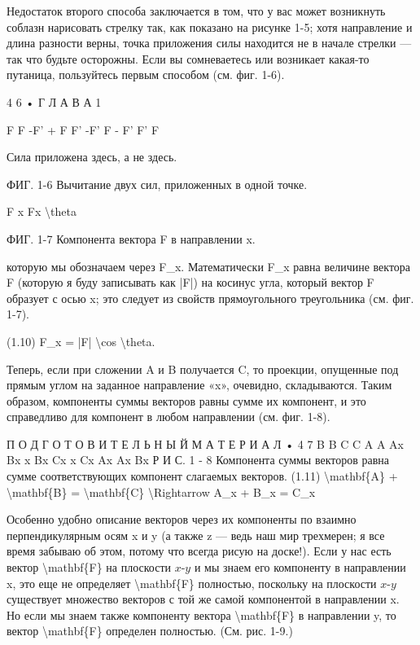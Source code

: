 \documentclass[10pt,oneside]{article}
\begin{document}
Недостаток второго способа заключается в том, что у вас может возникнуть соблазн нарисовать стрелку так, как показано на рисунке 1-5; хотя направление и длина разности верны, точка приложения силы находится не в начале стрелки --- так что будьте осторожны. Если вы сомневаетесь или возникает какая-то путаница, пользуйтесь первым способом (см. фиг. 1-6).\par

4 6 • Г Л А В А  1\par

F F -F' + F F' -F' F - F' F' F\par

Сила приложена здесь, а не здесь.\par

ФИГ. 1-6 Вычитание двух сил, приложенных в одной точке.\par

F x Fx \textbackslash{}theta\par

ФИГ. 1-7 Компонента вектора F в направлении x.\par

которую мы обозначаем через F\_x. Математически F\_x равна величине вектора F (которую я буду записывать как |F|) на косинус угла, который вектор F образует с осью x; это следует из свойств прямоугольного треугольника (см. фиг. 1-7).\par

(1.10) F\_x = |F| \textbackslash{}cos \textbackslash{}theta.\par

Теперь, если при сложении A и B получается C, то проекции, опущенные под прямым углом на заданное направление «x», очевидно, складываются. Таким образом, компоненты суммы векторов равны сумме их компонент, и это справедливо для компонент в любом направлении (см. фиг. 1-8).\par

П О Д Г О Т О В И Т Е Л Ь Н Ы Й   М А Т Е Р И А Л • 4 7 B B C C A A Ax Bx x Bx Cx x Cx Ax Ax Bx Р И С. 1 - 8 Компонента суммы векторов равна сумме соответствующих компонент слагаемых векторов. (1.11) \textbackslash{}mathbf\{A\} + \textbackslash{}mathbf\{B\} = \textbackslash{}mathbf\{C\} \textbackslash{}Rightarrow A\_x + B\_x = C\_x\par

Особенно удобно описание векторов через их компоненты по взаимно перпендикулярным осям x и y (а также z --- ведь наш мир трехмерен; я все время забываю об этом, потому что всегда рисую на доске!). Если у нас есть вектор \textbackslash{}mathbf\{F\} на плоскости \(x\text{-}y\) и мы знаем его компоненту в направлении x, это еще не определяет \textbackslash{}mathbf\{F\} полностью, поскольку на плоскости \(x\text{-}y\) существует множество векторов с той же самой компонентой в направлении x. Но если мы знаем также компоненту вектора \textbackslash{}mathbf\{F\} в направлении y, то вектор \textbackslash{}mathbf\{F\} определен полностью. (См. рис. 1-9.)\par
\end{document}
